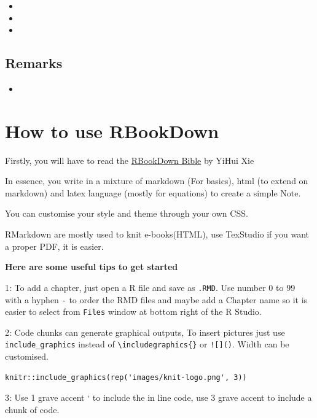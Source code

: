 \documentclass[
]{book}
\providecommand{\tightlist}{%
  \setlength{\itemsep}{0pt}\setlength{\parskip}{0pt}}
\begin{document}
\begin{itemize}
\tightlist
\item
\item
\item
\end{itemize}

\hypertarget{remarks}{%
\section*{Remarks}\label{remarks}}

\begin{itemize}
\tightlist
\item
\end{itemize}

\hypertarget{how-to-use-rbookdown}{%
\chapter*{How to use RBookDown}\label{how-to-use-rbookdown}}

Firstly, you will have to read the \href{https://bookdown.org/yihui/bookdown/}{RBookDown Bible} by YiHui Xie

In essence, you write in a mixture of markdown (For basics), html (to extend on markdown) and latex language (mostly for equations) to create a simple Note.

You can customise your style and theme through your own CSS.

RMarkdown are mostly used to knit e-books(HTML), use TexStudio if you want a proper PDF, it is easier.

\textbf{Here are some useful tips to get started}

1: To add a chapter, just open a R file and save as \texttt{.RMD}. Use number 0 to 99 with a hyphen \texttt{-} to order the RMD files and maybe add a Chapter name so it is easier to select from \texttt{Files} window at bottom right of the R Studio.

2: Code chunks can generate graphical outputs, To insert pictures just use \texttt{include\_graphics} instead of \texttt{\textbackslash{}includegraphics\{\}} or \texttt{!{[}{]}()}. Width can be customised.

\begin{verbatim}
knitr::include_graphics(rep('images/knit-logo.png', 3))
\end{verbatim}

3: Use 1 grave accent ` to include the in line code, use 3 grave accent to include a chunk of code.

  
\end{document}
